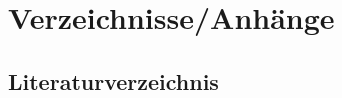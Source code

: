 \chapter{Verzeichnisse/Anhänge}
\section{Literaturverzeichnis}
\listoflistings
\listoffigures
\listoftables